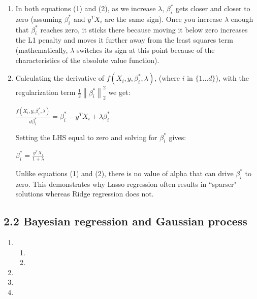 \documentclass{article}
\newcommand{\norm}[1]{\left\lVert#1\right\rVert}
\begin{document}
\begin{enumerate}
\item %

In both equations (1) and (2), as we increase $\lambda$, $\beta_i^\ast$ gets closer and closer to zero
(assuming $\beta_i^\ast$ and $y^TX_i$ are the same sign).
Once you increase $\lambda$ enough that $\beta_i^\ast$ reaches zero, it sticks there because moving it below zero
increases the L1 penalty and moves it further away from the least squares term (mathematically, $\lambda$ switches
its sign at this point because of the characteristics of the absolute value function). 

\item %

Calculating the derivative of $f(X_i,y,\beta_i^\ast,\lambda)$, (where $i$ in $\{1...d\}$),
with the regularization term $\frac{1}{2}\norm{\beta_i^\ast}_2^2$ we get: 

$\frac{f(X_i,y,\beta_i^\ast,\lambda)}{d\beta_i^\ast}=\beta_i^\ast-y^TX_i+\lambda\beta_i^\ast$

Setting the LHS equal to zero and solving for $\beta_i^\ast$ gives:

$\beta_i^\ast=\frac{y^TX_i}{1+\lambda}$

Unlike equations (1) and (2), there is no value of alpha that can drive $\beta_i^\ast$ to zero.
This demonstrates why Lasso regression often results in ``sparser" solutions whereas Ridge regression
does not.

\end{enumerate}
\subsection*{2.2 Bayesian regression and Gaussian process}

\begin{enumerate}
\setlength\itemsep{1em}

\item %

\begin{enumerate}

\item %

\item %

\end{enumerate}

\item %

\item %

\item %

\end{enumerate}
\end{document}
